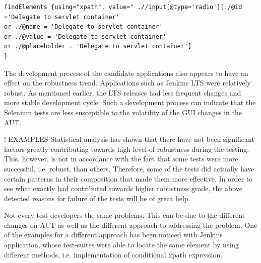 \begin{center}
\begin{scriptsize}
\centering
\lstset{
  basicstyle=\ttfamily,
  columns=fullflexible,
  keepspaces=true,
}
  
\begin{lstlisting}[caption=Jenkins conditional \texttt{xpath} expression,label=jenkinsxpath]
findElements {using="xpath", value=" .//input[@type='radio'][./@id ='Delegate to servlet container' 
or ./@name = 'Delegate to servlet container' 
or ./@value = 'Delegate to servlet container' 
or ./@placeholder = 'Delegate to servlet container']
}
\end{lstlisting}
\end{scriptsize} 
\end{center}


The development process of the candidate applications also appears to have an effect on the robustness trend. Applications such as Jenkins LTS were relatively robust. As mentioned earlier, the LTS releases had less frequent changes and more stable development cycle. Such a development process can indicate that the Selenium tests are less susceptible to the volatility of the GUI changes in the AUT.  

!
EXAMPLES
Statistical analysis has shown that there have not been significant factors greatly contributing towards high level of robustness during the testing. This, however, is not in accordance with the fact that some tests were more successful, i.e. robust, than others. Therefore, some of the tests did actually have certain patterns in their composition that made them more effective. In order to see what exactly had contributed towards higher robustness grade, the above detected reasons for failure of the tests will be of great help. 

Not every test developers the same problems. This can be due to the different changes on AUT as well as the different approach to addressing the problem. One of the examples for a different approach has been noticed with Jenkins application, whose test-suites were able to locate the same element by using different methods, i.e. implementation of conditional xpath expression.

